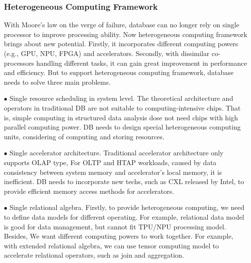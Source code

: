 
\subsubsection{Heterogeneous Computing Framework}

With Moore's law on the verge of failure, database can no longer rely on single processor to improve processing ability. Now heterogeneous computing framework brings about new potential. Firstly, it incorporates different computing powers (e.g., GPU, NPU, FPGA) and accelerators. Secondly, with dissimilar co-processors handling different tasks, it can gain great improvement in performance and efficiency. But to support heterogeneous computing framework, database needs to solve three main problems.

	$\bullet$ Single resource scheduling in system level. The theoretical architecture and operators in traditional DB are not suitable to computing-intensive chips. That is, simple computing in structured data analysis dose not need chips with high parallel computing power. DB needs to design special heterogeneous computing units, considering of computing and storing resources.

	$\bullet$ Single accelerator architecture. Traditional accelerator architecture only supports OLAP type, For OLTP and HTAP workloads, caused by data consistency between system memory and accelerator's local memory, it is inefficient. DB needs to incorporate new techs, such as CXL released by Intel, to provide efficient memory access methods for accelerators.

	$\bullet$ Single relational algebra. Firstly, to provide heterogeneous computing, we need to define data models for different operating. For example, relational data model is good for data management, but cannot fit TPU/NPU processing model. Besides, We want different computing powers to work together. For example, with extended relational algebra, we can use tensor computing model to accelerate relational operators, such as join and aggregation.



